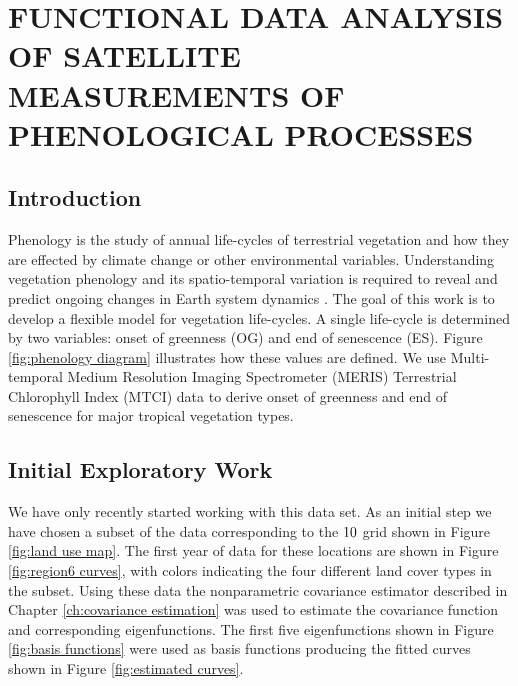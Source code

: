 

\chapter{FUNCTIONAL DATA ANALYSIS OF SATELLITE MEASUREMENTS OF PHENOLOGICAL PROCESSES} \label{future work}

\section{Introduction}

Phenology is the study of annual life-cycles of terrestrial vegetation and how they are effected by climate change or other environmental variables. Understanding vegetation phenology and its spatio-temporal variation is required to reveal and predict ongoing changes in Earth system dynamics \cite{Jeganathan:2010:0921-2973:1125}. The goal of this work is to develop a flexible model for vegetation life-cycles. A single life-cycle is determined by two variables: onset of greenness (OG) and end of senescence (ES). Figure \ref{fig:phenology diagram} illustrates how these values are defined. We use Multi-temporal Medium Resolution Imaging Spectrometer (MERIS) Terrestrial Chlorophyll Index (MTCI) data to derive onset of greenness and end of senescence for major tropical vegetation types.

\section{Initial Exploratory Work} We have only recently started working with this data set. As an initial step we have chosen a subset of the data corresponding to the $10\time 10$ grid shown in Figure \ref{fig:land use map}. The first year of data for these locations are shown in Figure \ref{fig:region6 curves}, with colors indicating the four different land cover types in the subset. Using these data the nonparametric covariance estimator described in Chapter \ref{ch:covariance estimation} was used to estimate the covariance function and corresponding eigenfunctions. The first five eigenfunctions shown in Figure \ref{fig:basis functions} were used as basis functions producing the fitted curves shown in Figure \ref{fig:estimated curves}. 


